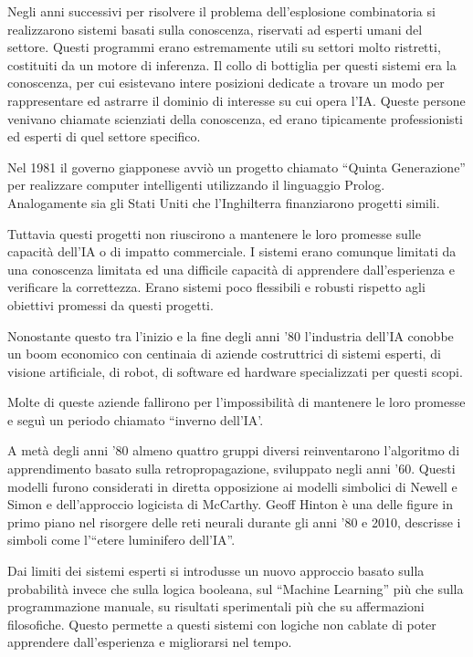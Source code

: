 \documentclass{article}
\numberwithin{equation}{subsection}
\begin{document}
Negli anni successivi per risolvere il problema dell'esplosione combinatoria si 
realizzarono sistemi basati sulla conoscenza, riservati ad esperti umani del settore. 
Questi programmi erano estremamente utili su settori molto ristretti, costituiti da un motore 
di inferenza. 
Il collo di bottiglia per questi sistemi era la conoscenza, per cui esistevano intere posizioni 
dedicate a trovare un modo per rappresentare ed astrarre il dominio di interesse su cui 
opera l'IA. Queste persone venivano chiamate scienziati della conoscenza, ed erano tipicamente 
professionisti ed esperti di quel settore specifico. 

Nel 1981 il governo giapponese avviò un progetto chiamato ``Quinta Generazione'' per realizzare 
computer intelligenti utilizzando il linguaggio Prolog. Analogamente sia gli Stati Uniti che 
l'Inghilterra finanziarono progetti simili. 

Tuttavia questi progetti non riuscirono a mantenere le loro promesse sulle capacità 
dell'IA o di impatto commerciale. I sistemi erano comunque limitati da una conoscenza limitata 
ed una difficile capacità di apprendere dall'esperienza e verificare la correttezza. Erano 
sistemi poco flessibili e robusti rispetto agli obiettivi promessi da questi progetti. 

Nonostante questo tra l'inizio e la fine degli anni '80 l'industria dell'IA conobbe un boom 
economico con centinaia di aziende costruttrici di sistemi esperti, di visione artificiale, 
di robot, di software ed hardware specializzati per questi scopi. 

Molte di queste aziende fallirono per l'impossibilità di mantenere le loro promesse e seguì 
un periodo chiamato ``inverno dell'IA'. 


A metà degli anni '80 almeno quattro gruppi diversi reinventarono l'algoritmo di apprendimento 
basato sulla retropropagazione, sviluppato negli anni '60. Questi modelli furono considerati 
in diretta opposizione ai modelli simbolici di Newell e Simon e dell'approccio logicista 
di McCarthy. 
Geoff Hinton è una delle figure in primo piano nel risorgere delle reti neurali durante 
gli anni '80 e 2010, descrisse i simboli come l'``etere luminifero dell'IA''. 

Dai limiti dei sistemi esperti si introdusse un nuovo approccio basato sulla probabilità invece 
che sulla logica booleana, sul ``Machine Learning'' più che sulla programmazione manuale, 
su risultati sperimentali più che su affermazioni filosofiche. Questo permette a questi 
sistemi con logiche non cablate di poter apprendere dall'esperienza e migliorarsi nel tempo. 
\end{document}
